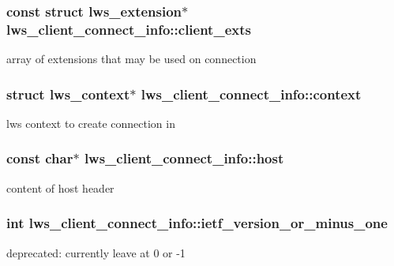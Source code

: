 \subsubsection[{\texorpdfstring{client\+\_\+exts}{client\_exts}}]{\setlength{\rightskip}{0pt plus 5cm}const struct {\bf lws\+\_\+extension}$\ast$ lws\+\_\+client\+\_\+connect\+\_\+info\+::client\+\_\+exts}\hypertarget{structlws__client__connect__info_a7732b996e977393c3e1076be2a8ded6c}{}\label{structlws__client__connect__info_a7732b996e977393c3e1076be2a8ded6c}
array of extensions that may be used on connection 
\subsubsection[{\texorpdfstring{context}{context}}]{\setlength{\rightskip}{0pt plus 5cm}struct lws\+\_\+context$\ast$ lws\+\_\+client\+\_\+connect\+\_\+info\+::context}\hypertarget{structlws__client__connect__info_afe999d133cc240a0bfd02aade0514cfd}{}\label{structlws__client__connect__info_afe999d133cc240a0bfd02aade0514cfd}
lws context to create connection in 
\subsubsection[{\texorpdfstring{host}{host}}]{\setlength{\rightskip}{0pt plus 5cm}const char$\ast$ lws\+\_\+client\+\_\+connect\+\_\+info\+::host}\hypertarget{structlws__client__connect__info_a9b36d47c3422329df32c21040a35ebc7}{}\label{structlws__client__connect__info_a9b36d47c3422329df32c21040a35ebc7}
content of host header 
\subsubsection[{\texorpdfstring{ietf\+\_\+version\+\_\+or\+\_\+minus\+\_\+one}{ietf\_version\_or\_minus\_one}}]{\setlength{\rightskip}{0pt plus 5cm}int lws\+\_\+client\+\_\+connect\+\_\+info\+::ietf\+\_\+version\+\_\+or\+\_\+minus\+\_\+one}\hypertarget{structlws__client__connect__info_a69abb5aeed755750b9755e5c91db6895}{}\label{structlws__client__connect__info_a69abb5aeed755750b9755e5c91db6895}
deprecated\+: currently leave at 0 or -\/1 
